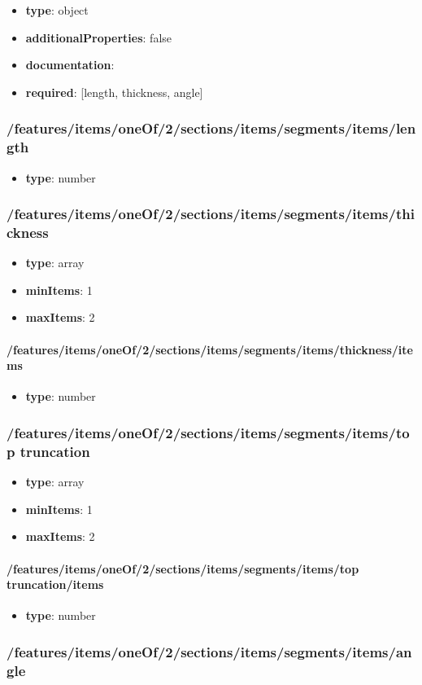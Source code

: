 \begin{itemize}\item {\bf type}: object
\item {\bf additionalProperties}: false
\item {\bf documentation}: 
\item {\bf required}: [length, thickness, angle]\end{itemize}
\subsubsection{/features/items/oneOf/2/sections/items/segments/items/length}
\begin{itemize}\item {\bf type}: number
\end{itemize}\subsubsection{/features/items/oneOf/2/sections/items/segments/items/thickness}
\begin{itemize}\item {\bf type}: array
\item {\bf minItems}: 1
\item {\bf maxItems}: 2
\end{itemize}\paragraph{/features/items/oneOf/2/sections/items/segments/items/thickness/items}
\begin{itemize}\item {\bf type}: number
\end{itemize}\subsubsection{/features/items/oneOf/2/sections/items/segments/items/top truncation}
\begin{itemize}\item {\bf type}: array
\item {\bf minItems}: 1
\item {\bf maxItems}: 2
\end{itemize}\paragraph{/features/items/oneOf/2/sections/items/segments/items/top truncation/items}
\begin{itemize}\item {\bf type}: number
\end{itemize}\subsubsection{/features/items/oneOf/2/sections/items/segments/items/angle}
